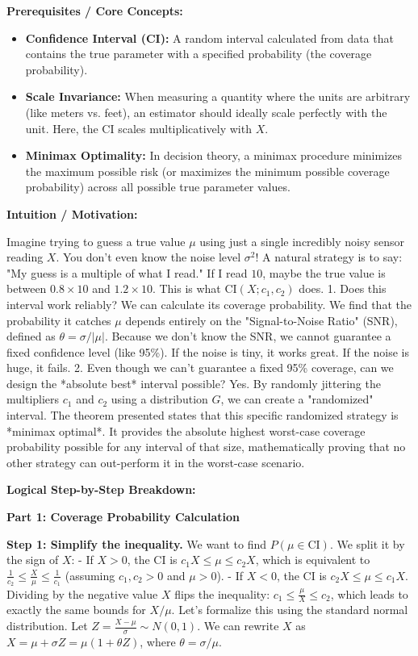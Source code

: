 \begin{solution}
\textbf{Prerequisites / Core Concepts:}
\begin{itemize}
    \item \textbf{Confidence Interval (CI):} A random interval calculated from data that contains the true parameter with a specified probability (the coverage probability).
    \item \textbf{Scale Invariance:} When measuring a quantity where the units are arbitrary (like meters vs. feet), an estimator should ideally scale perfectly with the unit. Here, the CI scales multiplicatively with $X$.
    \item \textbf{Minimax Optimality:} In decision theory, a minimax procedure minimizes the maximum possible risk (or maximizes the minimum possible coverage probability) across all possible true parameter values.
\end{itemize}

\textbf{Intuition / Motivation:}

Imagine trying to guess a true value $\mu$ using just a single incredibly noisy sensor reading $X$. You don't even know the noise level $\sigma^2$!
A natural strategy is to say: "My guess is a multiple of what I read." If I read $10$, maybe the true value is between $0.8 \times 10$ and $1.2 \times 10$. This is what $\mathrm{CI}(X; c_1, c_2)$ does.
1. Does this interval work reliably? We can calculate its coverage probability. We find that the probability it catches $\mu$ depends entirely on the "Signal-to-Noise Ratio" (SNR), defined as $\theta = \sigma/|\mu|$. Because we don't know the SNR, we cannot guarantee a fixed confidence level (like 95\%). If the noise is tiny, it works great. If the noise is huge, it fails.
2. Even though we can't guarantee a fixed 95\% coverage, can we design the *absolute best* interval possible? Yes. By randomly jittering the multipliers $c_1$ and $c_2$ using a distribution $G$, we can create a "randomized" interval. The theorem presented states that this specific randomized strategy is *minimax optimal*. It provides the absolute highest worst-case coverage probability possible for any interval of that size, mathematically proving that no other strategy can out-perform it in the worst-case scenario.

\textbf{Logical Step-by-Step Breakdown:}

\textbf{Part 1: Coverage Probability Calculation}

\textbf{Step 1: Simplify the inequality.}
We want to find $P(\mu \in \mathrm{CI})$. We split it by the sign of $X$:
- If $X > 0$, the CI is $c_1 X \leq \mu \leq c_2 X$, which is equivalent to $\frac{1}{c_2} \leq \frac{X}{\mu} \leq \frac{1}{c_1}$ (assuming $c_1, c_2 > 0$ and $\mu > 0$).
- If $X < 0$, the CI is $c_2 X \leq \mu \leq c_1 X$. Dividing by the negative value $X$ flips the inequality: $c_1 \leq \frac{\mu}{X} \leq c_2$, which leads to exactly the same bounds for $X/\mu$.
Let's formalize this using the standard normal distribution. Let $Z = \frac{X - \mu}{\sigma} \sim N(0,1)$.
We can rewrite $X$ as $X = \mu + \sigma Z = \mu (1 + \theta Z)$, where $\theta = \sigma/\mu$.


\end{solution}
